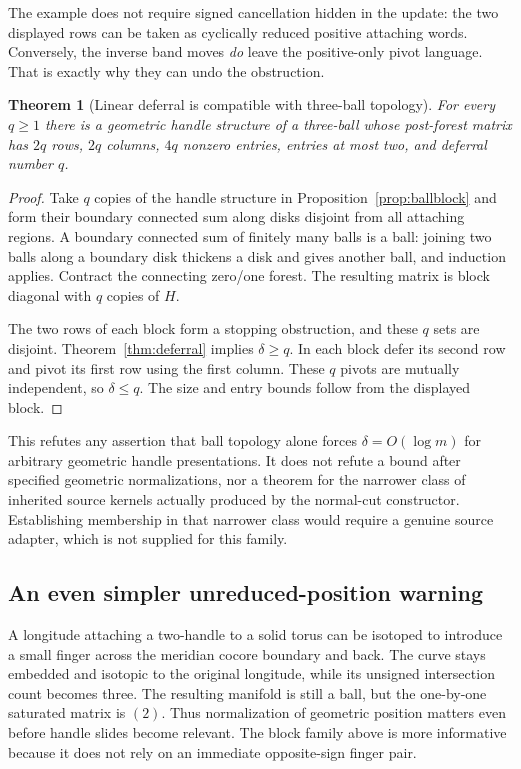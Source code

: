 \documentclass[11pt]{article}
\newtheorem{theorem}{Theorem}[section]
\theoremstyle{definition}\newtheorem{definition}[theorem]{Definition}
\theoremstyle{remark}\newtheorem{remark}[theorem]{Remark}
\begin{document}
The example does not require signed cancellation hidden in the update: the two displayed rows can be taken as cyclically reduced positive attaching words. Conversely, the inverse band moves \emph{do} leave the positive-only pivot language. That is exactly why they can undo the obstruction.

\begin{theorem}[Linear deferral is compatible with three-ball topology]
\label{thm:ballfamily}
For every $q\geq1$ there is a geometric handle structure of a three-ball whose post-forest matrix has $2q$ rows, $2q$ columns, $4q$ nonzero entries, entries at most two, and deferral number $q$.
\end{theorem}
\begin{proof}
Take $q$ copies of the handle structure in Proposition~\ref{prop:ballblock} and form their boundary connected sum along disks disjoint from all attaching regions. A boundary connected sum of finitely many balls is a ball: joining two balls along a boundary disk thickens a disk and gives another ball, and induction applies. Contract the connecting zero/one forest. The resulting matrix is block diagonal with $q$ copies of $H$.

The two rows of each block form a stopping obstruction, and these $q$ sets are disjoint. Theorem~\ref{thm:deferral} implies $\delta\geq q$. In each block defer its second row and pivot its first row using the first column. These $q$ pivots are mutually independent, so $\delta\leq q$. The size and entry bounds follow from the displayed block.
\end{proof}

This refutes any assertion that ball topology alone forces $\delta=O(\log m)$ for arbitrary geometric handle presentations. It does not refute a bound after specified geometric normalizations, nor a theorem for the narrower class of inherited source kernels actually produced by the normal-cut constructor. Establishing membership in that narrower class would require a genuine source adapter, which is not supplied for this family.

\subsection{An even simpler unreduced-position warning}
A longitude attaching a two-handle to a solid torus can be isotoped to introduce a small finger across the meridian cocore boundary and back. The curve stays embedded and isotopic to the original longitude, while its unsigned intersection count becomes three. The resulting manifold is still a ball, but the one-by-one saturated matrix is $(2)$. Thus normalization of geometric position matters even before handle slides become relevant. The block family above is more informative because it does not rely on an immediate opposite-sign finger pair.
\end{document}
